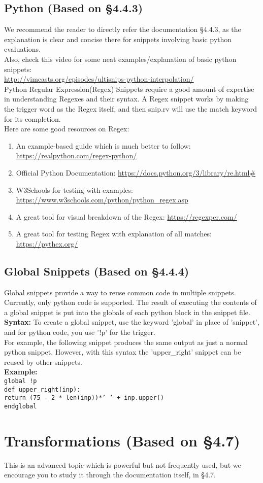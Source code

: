 \documentclass[11pt]{article}
\theoremstyle{plain}%
\theoremstyle{definition}
\theoremstyle{remark}
\begin{document}
	\subsection{Python (Based on \S4.4.3)}
	We recommend the reader to directly refer the documentation \S4.4.3, as the explanation is clear and concise there for snippets involving basic python evaluations. \\
	Also, check this video for some neat examples/explanation of basic python snippets: \\
	\url{http://vimcasts.org/episodes/ultisnips-python-interpolation/}\\
	Python Regular Expression(Regex) Snippets require a good amount of expertise in understanding Regexes and their syntax. A Regex snippet works by making the trigger word as the Regex itself, and then snip.rv will use the match keyword for its completion. \\
	Here are some good resources on Regex: 
	\begin{enumerate}
		\item An example-based guide which is much better to follow: \\
			\url{https://realpython.com/regex-python/}
		\item Official Python Documentation: \url{https://docs.python.org/3/library/re.html#}
		\item W3Schools for testing with examples: \url{https://www.w3schools.com/python/python_regex.asp}
		\item A great tool for visual breakdown of the Regex: \url{https://regexper.com/}
		\item A great tool for testing Regex with explanation of all matches: \url{https://pythex.org/} 
	\end{enumerate}
	
	\subsection{Global Snippets (Based on \S4.4.4)}
	Global snippets provide a way to reuse common code in multiple snippets. Currently, only python code is supported. The result of executing the contents of a global snippet is put into the globals of each python block in the snippet file. \\
	\textbf{Syntax:} To create a global snippet, use the keyword 'global' in place of 'snippet', and for python code, you use '!p' for the trigger. \\
	For example, the following snippet produces the same output as just a normal python snippet. However, with this syntax the 'upper\_right' snippet can be reused by other snippets.\\
	\textbf{Example:} \\
	\texttt{global !p \\
	def upper\_right(inp): \\
	    return (75 - 2 * len(inp))*' ' + inp.upper() \\
	endglobal}

	\section{Transformations (Based on \S4.7)}
	This is an advanced topic which is powerful but not frequently used, but we encourage you to study it through the documentation itself, in \S4.7.
\end{document}
